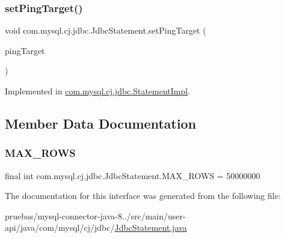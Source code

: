 \mbox{\label{interfacecom_1_1mysql_1_1cj_1_1jdbc_1_1_jdbc_statement_a7cf024a169c62cd9acbd867518a82dfc}} 
\subsubsection{\texorpdfstring{set\+Ping\+Target()}{setPingTarget()}}
{\footnotesize\ttfamily void com.\+mysql.\+cj.\+jdbc.\+Jdbc\+Statement.\+set\+Ping\+Target (\begin{DoxyParamCaption}\item[{\mbox{\hyperlink{interfacecom_1_1mysql_1_1cj_1_1_ping_target}{Ping\+Target}}}]{ping\+Target }\end{DoxyParamCaption})}



Implemented in \mbox{\hyperlink{classcom_1_1mysql_1_1cj_1_1jdbc_1_1_statement_impl_abf41b78c8e7c3e4f62f7bedb8bf1a4b0}{com.\+mysql.\+cj.\+jdbc.\+Statement\+Impl}}.



\subsection{Member Data Documentation}
\mbox{\label{interfacecom_1_1mysql_1_1cj_1_1jdbc_1_1_jdbc_statement_af93a548fefe7b195a578434d9e647a7d}} 
\subsubsection{\texorpdfstring{M\+A\+X\+\_\+\+R\+O\+WS}{MAX\_ROWS}}
{\footnotesize\ttfamily final int com.\+mysql.\+cj.\+jdbc.\+Jdbc\+Statement.\+M\+A\+X\+\_\+\+R\+O\+WS = 50000000\hspace{0.3cm}{\ttfamily [static]}}



The documentation for this interface was generated from the following file\+:\begin{DoxyCompactItemize}
\item 
pruebas/mysql-\/connector-\/java-\/8../src/main/user-\/api/java/com/mysql/cj/jdbc/\mbox{\hyperlink{_jdbc_statement_8java}{Jdbc\+Statement.\+java}}\end{DoxyCompactItemize}
